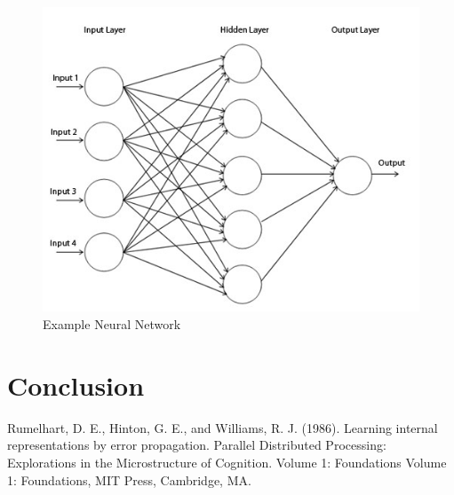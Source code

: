 \documentclass[conference]{IEEEtran}
\begin{document}
\begin{figure}
  \centering
  \includegraphics[width=\linewidth]{network.jpg}
  \caption{Example Neural Network}
  \label{fig:exampleNetwork}
\end{figure}

\section{Conclusion}


\begin{thebibliography}{1}

  Rumelhart, D. E., Hinton, G. E., and Williams, R. J. (1986). Learning internal representations by error propagation. Parallel Distributed Processing: Explorations in the Microstructure of Cognition. Volume 1: Foundations Volume 1: Foundations, MIT Press, Cambridge, MA.

\end{thebibliography}
\end{document}
